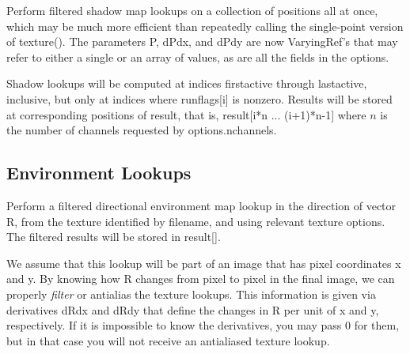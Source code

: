 \apiend


Perform filtered shadow map lookups on a collection of positions all at
once, which may be much more efficient than repeatedly calling the
single-point version of {\cf texture()}.  The parameters {\cf P},
{\cf dPdx}, and {\cf dPdy} are now
{\cf VaryingRef}'s that may refer to either a single or an array of
values, as are all the fields in the {\cf options}.

Shadow lookups will be computed at indices {\cf firstactive} through
{\cf lastactive}, inclusive, but only at indices where {\cf runflags[i]}
is nonzero.  Results will be stored at corresponding positions of
{\cf result}, that is, {\cf result[i*n ... (i+1)*n-1]} where $n$ 
is the number of channels requested by {\cf options.nchannels}.
\apiend

\newpage
\subsection{Environment Lookups}
\label{sec:texturesys:api:environment}


Perform a filtered directional environment map lookup in the direction
of vector {\cf R}, from the texture identified by {\cf filename}, and
using relevant texture {\cf options}.  The filtered results will be
stored in {\cf result[]}.

We assume that this lookup will be part of an image that has pixel
coordinates {\cf x} and {\cf y}.  By knowing how {\cf R} changes from
pixel to pixel in the final image, we can properly \emph{filter} or
antialias the texture lookups.  This information is given via
derivatives {\cf dRdx} and {\cf dRdy} that define the changes in {\cf R}
per unit of {\cf x} and {\cf y}, respectively.  If it is impossible to
know the derivatives, you may pass 0 for them, but in that case you will
not receive an antialiased texture lookup.

